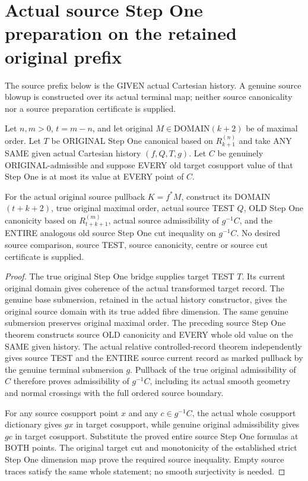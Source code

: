\section{Actual source Step One preparation on the retained original prefix}

The source prefix below is the GIVEN actual Cartesian history. A genuine
source blowup is constructed over its actual terminal map; neither source
canonicality nor a source preparation certificate is supplied.

\begin{theorem}
\label{hir:original-stepone-whole-cut-source-data}
\leanok
Let $n,m>0$, $t=m-n$, and let original $M\in\mathrm{DOMAIN}(k+2)$ be of
maximal order. Let $T$ be ORIGINAL Step One canonical based on
$R^{(n)}_{k+1}$ and take ANY SAME given actual Cartesian history
$(f,Q,T,g)$. Let $C$ be genuinely ORIGINAL-admissible and suppose EVERY
old target cosupport value of that Step One is at most its value at
EVERY point of $C$.

For the actual original source pullback $K=f^*M$, construct its
DOMAIN$(t+k+2)$, true original maximal order, actual source TEST $Q$,
OLD Step One canonicity based on $R^{(m)}_{t+k+1}$, actual source
admissibility of $g^{-1}C$, and the ENTIRE analogous old source Step One
cut inequality on $g^{-1}C$. No desired source comparison, source TEST,
source canonicity, centre or source cut certificate is supplied.
\end{theorem}
\begin{proof}
The true original Step One bridge supplies target TEST $T$. Its current
original domain gives coherence of the actual transformed target record.
The genuine base submersion, retained in the actual history constructor,
gives the original source domain with its true added fibre dimension.
The same genuine submersion preserves original maximal order.
The preceding source Step One theorem constructs source OLD canonicity
and EVERY whole old value on the SAME given history. The actual relative
controlled-record theorem independently gives source TEST and the ENTIRE
source current record as marked pullback by the genuine terminal
submersion $g$. Pullback of the true original admissibility of $C$
therefore proves admissibility of $g^{-1}C$, including its actual smooth
geometry and normal crossings with the full ordered source boundary.

For any source cosupport point $x$ and any $c\in g^{-1}C$, the actual
whole cosupport dictionary gives $gx$ in target cosupport, while genuine
original admissibility gives $gc$ in target cosupport. Substitute the
proved entire source Step One formulas at BOTH points. The original
target cut and monotonicity of the established strict Step One dimension
map prove the required source inequality. Empty source traces satisfy
the same whole statement; no smooth surjectivity is needed.
\end{proof}

